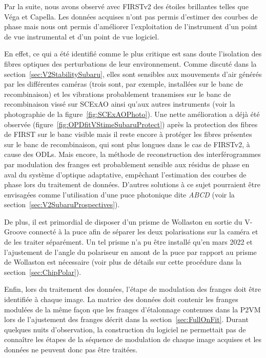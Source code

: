 Par la suite, nous avons observé avec \ac{FIRSTv2} des étoiles brillantes telles que Véga et Capella. Les données acquises n'ont pas permis d'estimer des courbes de phase mais nous ont permis d'améliorer l'exploitation de l'instrument d'un point de vue instrumental et d'un point de vue logiciel. 

En effet, ce qui a été identifié comme le plus critique est sans doute l'isolation des fibres optiques des perturbations de leur environnement. Comme discuté dans la section~\ref{sec:V2StabilitySubaru}, elles sont sensibles aux mouvements d'air générés par les différentes caméras (trois sont, par exemple, installées sur le banc de recombinaison) et les vibrations probablement transmises sur le banc de recombinaison vissé sur \ac{SCExAO} ainsi qu'aux autres instruments (voir la photographie de la figure~\ref{fig:SCExAOPhoto}). Une nette amélioration a déjà été observée (figure~\ref{fig:OPDfitVStimeSubaruProtect}) après la protection des fibres de \ac{FIRST} sur le banc visible mais il reste encore à protéger les fibres présentes sur le banc de recombinaison, qui sont plus longues dans le cas de \ac{FIRSTv2}, à cause des \ac{ODL}s. Mais encore, la méthode de reconstruction des interférogrammes par modulation des franges est probablement sensible aux résidus de phase en aval du système d'optique adaptative, empêchant l'estimation des courbes de phase lors du traitement de données. D'autres solutions à ce sujet pourraient être envisagées comme l'utilisation d'une puce photonique dite \textit{ABCD} (voir la section~\ref{sec:V2SubaruProspectives}).

De plus, il est primordial de disposer d'un prisme de Wollaston en sortie du V-Groove connecté à la puce afin de séparer les deux polarisations sur la caméra et de les traiter séparément. Un tel prisme n'a pu être installé qu'en mars 2022 et l'ajustement de l'angle du polariseur en amont de la puce par rapport au prisme de Wollaston est nécessaire (voir plus de détails sur cette procédure dans la section~\ref{sec:ChipPolar}).

Enfin, lors du traitement des données, l'étape de modulation des franges doit être identifiée à chaque image. La matrice des données doit contenir les franges modulées de la même façon que les franges d'étalonnage contenues dans la \ac{P2VM} lors de l'ajustement des franges décrit dans la section~\ref{sec:FullOnFit}. Durant quelques nuits d'observation, la construction du logiciel ne permettait pas de connaître les étapes de la séquence de modulation de chaque image acquises et les données ne peuvent donc pas être traitées.


